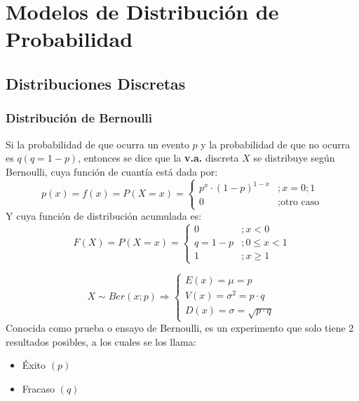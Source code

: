 \chapter{Modelos de Distribución de Probabilidad}
\section{Distribuciones Discretas}
\subsection{Distribución de Bernoulli}
Si la probabilidad de que ocurra un evento $p$ y la probabilidad de que no ocurra es $q(q=1-p)$, entonces se dice que la \textbf{v.a.} discreta $X$ se distribuye según Bernoulli, cuya función de cuantía está dada por:
$$p(x)=f(x)=P(X=x)=
\begin{cases}
p^x\cdot (1-p)^{1-x} &; x=0;1 \\
0 &; \text{otro caso}
\end{cases}
$$
Y cuya función de distribución acumulada es:
$$
F(X)=P(X=x)=
\begin{cases}
0 &; x<0\\
q=1-p &; 0\leq x < 1\\
1 &; x\geq 1
\end{cases}
$$

$$
X \sim Ber(x;p)\Rightarrow 
\begin{cases}
E(x)=\mu = p \\
V(x)=\sigma^2 = p\cdot q \\
D(x) = \sigma = \sqrt{p\cdot q}
\end{cases}
$$
Conocida como prueba o ensayo de Bernoulli, es un experimento que solo tiene 2 resultados posibles, a los cuales se los llama:
\begin{itemize}
\item Éxito $(p)$
\item Fracaso $(q)$
\end{itemize}
